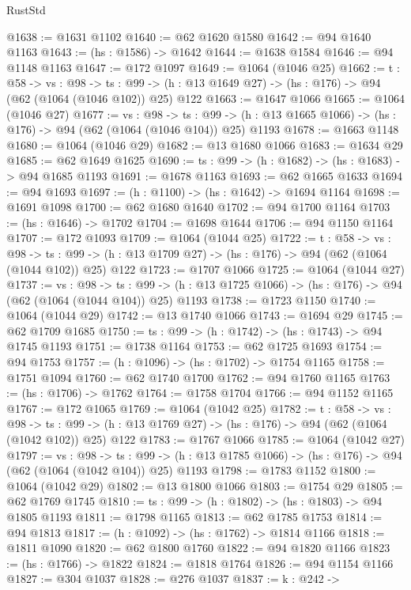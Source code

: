 \begin{lexlean}{RustStd}
\begin{coremodule}
@1638 := @1631 @1102
@1640 := @62 @1620 @1580
@1642 := @94 @1640 @1163
@1643 := (hs : @1586) -> @1642
@1644 := @1638 @1584
@1646 := @94 @1148 @1163
@1647 := @172 @1097
@1649 := @1064 (@1046 @25)
@1662 := {t : @58} ->
  {vs : @98} ->
  {ts : @99} -> (h : @13 @1649 @27) -> (hs : @176) -> @94 (@62 (@1064 (@1046 @102)) @25) @122
@1663 := @1647 @1066
@1665 := @1064 (@1046 @27)
@1677 := {vs : @98} ->
  {ts : @99} -> (h : @13 @1665 @1066) -> (hs : @176) -> @94 (@62 (@1064 (@1046 @104)) @25) @1193
@1678 := @1663 @1148
@1680 := @1064 (@1046 @29)
@1682 := @13 @1680 @1066
@1683 := @1634 @29
@1685 := @62 @1649 @1625
@1690 := {ts : @99} -> (h : @1682) -> (hs : @1683) -> @94 @1685 @1193
@1691 := @1678 @1163
@1693 := @62 @1665 @1633
@1694 := @94 @1693
@1697 := (h : @1100) -> (hs : @1642) -> @1694 @1164
@1698 := @1691 @1098
@1700 := @62 @1680 @1640
@1702 := @94 @1700 @1164
@1703 := (hs : @1646) -> @1702
@1704 := @1698 @1644
@1706 := @94 @1150 @1164
@1707 := @172 @1093
@1709 := @1064 (@1044 @25)
@1722 := {t : @58} ->
  {vs : @98} ->
  {ts : @99} -> (h : @13 @1709 @27) -> (hs : @176) -> @94 (@62 (@1064 (@1044 @102)) @25) @122
@1723 := @1707 @1066
@1725 := @1064 (@1044 @27)
@1737 := {vs : @98} ->
  {ts : @99} -> (h : @13 @1725 @1066) -> (hs : @176) -> @94 (@62 (@1064 (@1044 @104)) @25) @1193
@1738 := @1723 @1150
@1740 := @1064 (@1044 @29)
@1742 := @13 @1740 @1066
@1743 := @1694 @29
@1745 := @62 @1709 @1685
@1750 := {ts : @99} -> (h : @1742) -> (hs : @1743) -> @94 @1745 @1193
@1751 := @1738 @1164
@1753 := @62 @1725 @1693
@1754 := @94 @1753
@1757 := (h : @1096) -> (hs : @1702) -> @1754 @1165
@1758 := @1751 @1094
@1760 := @62 @1740 @1700
@1762 := @94 @1760 @1165
@1763 := (hs : @1706) -> @1762
@1764 := @1758 @1704
@1766 := @94 @1152 @1165
@1767 := @172 @1065
@1769 := @1064 (@1042 @25)
@1782 := {t : @58} ->
  {vs : @98} ->
  {ts : @99} -> (h : @13 @1769 @27) -> (hs : @176) -> @94 (@62 (@1064 (@1042 @102)) @25) @122
@1783 := @1767 @1066
@1785 := @1064 (@1042 @27)
@1797 := {vs : @98} ->
  {ts : @99} -> (h : @13 @1785 @1066) -> (hs : @176) -> @94 (@62 (@1064 (@1042 @104)) @25) @1193
@1798 := @1783 @1152
@1800 := @1064 (@1042 @29)
@1802 := @13 @1800 @1066
@1803 := @1754 @29
@1805 := @62 @1769 @1745
@1810 := {ts : @99} -> (h : @1802) -> (hs : @1803) -> @94 @1805 @1193
@1811 := @1798 @1165
@1813 := @62 @1785 @1753
@1814 := @94 @1813
@1817 := (h : @1092) -> (hs : @1762) -> @1814 @1166
@1818 := @1811 @1090
@1820 := @62 @1800 @1760
@1822 := @94 @1820 @1166
@1823 := (hs : @1766) -> @1822
@1824 := @1818 @1764
@1826 := @94 @1154 @1166
@1827 := @304 @1037
@1828 := @276 @1037
@1837 := {k : @242} ->

\end{coremodule}
\end{lexlean}
